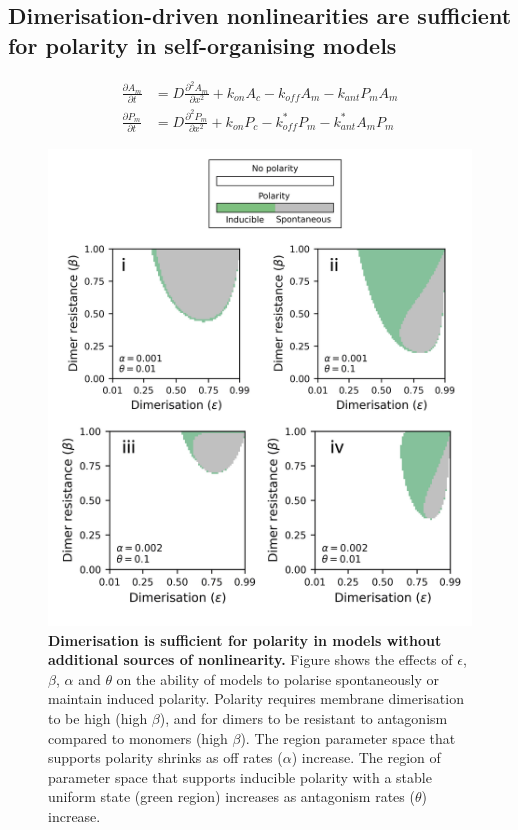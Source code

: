 \documentclass[12pt]{"report"}
\newcommand{\mycaption}[2]{\caption[#1]{\textbf{#1.} #2}}
\begin{document}
\clearpage
\subsection{Dimerisation-driven nonlinearities are sufficient for polarity in self-organising models}

\begin{align}
\frac{\partial A_m}{\partial t} &= D \frac{\partial^2 A_m}{\partial x^2} + k_{on} A_c - k_{off} A_m - k_{ant} P_m A_m\\
\frac{\partial P_m}{\partial t} &= D \frac{\partial^2 P_m}{\partial x^2} + k_{on} P_c - k_{off}^* P_m - k_{ant}^* A_m P_m
\end{align}


\begin{figure}
\includegraphics[scale=1]{dimer_model_triggering}
\centering
\mycaption{Dimerisation is sufficient for polarity in models without additional sources of nonlinearity}{
Figure shows the effects of $\epsilon$, $\beta$, $\alpha$ and $\theta$ on the ability of models to polarise spontaneously or maintain induced polarity. Polarity requires membrane dimerisation to be high (high $\beta$), and for dimers to be resistant to antagonism compared to monomers (high $\beta$). The region parameter space that supports polarity shrinks as off rates ($\alpha$) increase. The region of parameter space that supports inducible polarity with a stable uniform state (green region) increases as antagonism rates ($\theta$) increase.
}
\label{fig:dimer_model_triggering}
\end{figure}
\end{document}
